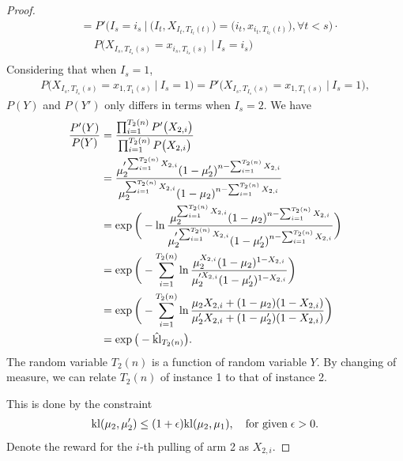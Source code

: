\begin{proof}
\begin{equation}
\begin{split}
            &=P'\Big(I_s=i_s~\Big|~
            \big(I_t, X_{I_t, T_{I_t}(t)}\big)=\big(i_t, x_{i_t, T_{i_t}(t)}\big), \forall t<s\Big) \cdot \\
            &\quad~P\Big(X_{I_s, T_{I_s}(s)}=x_{i_s, T_{i_s}(s)}~\Big|~I_s=i_s\Big) \\
        \end{split}
    \end{equation}
    Considering that when $I_s=1$,
    \begin{align}
        P\Big(X_{I_s, T_{I_s}(s)}=x_{1, T_{1}(s)}~\Big|~I_s=1\Big) = P'\Big(X_{I_s, T_{I_s}(s)}=x_{1, T_{1}(s)}~\Big|~I_s=1\Big),
    \end{align}
    $P(Y)$ and $P(Y')$ only differs in terms when $I_s=2$.
    We have
    \begin{align}
        \frac{P'(Y)}{P(Y)}
            &= \frac{\prod_{i=1}^{T_2(n)}P'\big(X_{2, i}\big)}{\prod_{i=1}^{T_2(n)}P\big(X_{2, i}\big)} \\
            &= \frac{\mu_2'^{\sum_{i=1}^{T_2(n)} X_{2,i}}(1-\mu_2')^{n-\sum_{i=1}^{T_2(n)} X_{2,i}}}
                {\mu_2^{\sum_{i=1}^{T_2(n)} X_{2,i}}(1-\mu_2)^{n-\sum_{i=1}^{T_2(n)} X_{2,i}}} \\
            &= \exp\bigg(-\ln
                \frac{\mu_2^{\sum_{i=1}^{T_2(n)} X_{2,i}}(1-\mu_2)^{n-\sum_{i=1}^{T_2(n)} X_{2,i}}}
                {\mu_2'^{\sum_{i=1}^{T_2(n)} X_{2,i}}(1-\mu_2')^{n-\sum_{i=1}^{T_2(n)} X_{2,i}}}\bigg) \\
            &= \exp\bigg(-\sum_{i=1}^{T_2(n)} \ln
                \frac{\mu_2^{X_{2,i}}(1-\mu_2)^{1-X_{2,i}}}
                {\mu_2'^{X_{2,i}}(1-\mu_2')^{1-X_{2,i}}}\bigg) \\
            &= \exp\bigg(-\sum_{i=1}^{T_2(n)} \ln
                \frac{\mu_2 X_{2,i} + (1-\mu_2) (1-X_{2,i})}
                {\mu_2' X_{2,i} + (1-\mu_2')(1-X_{2,i})}\bigg) \\
            &= \exp\big(-\hat{{\mathop{\mathrm{kl}}}}_{T_2(n)}\big).
    \end{align}
    The random variable $T_2(n)$ is a function of random variable $Y$.
    By changing of measure,
    we can relate $T_2(n)$ of instance 1 to that of instance 2.


    This is done by the constraint
    \begin{align}
        {\mathop{\mathrm{kl}}}(\mu_2, \mu_2')\le(1+\epsilon){\mathop{\mathrm{kl}}}(\mu_2,\mu_1), \quad \text{for given}\; \epsilon>0.
    \end{align}
    Denote the reward for the $i$-th pulling of arm 2 as $X_{2,i}$.






\end{proof}
